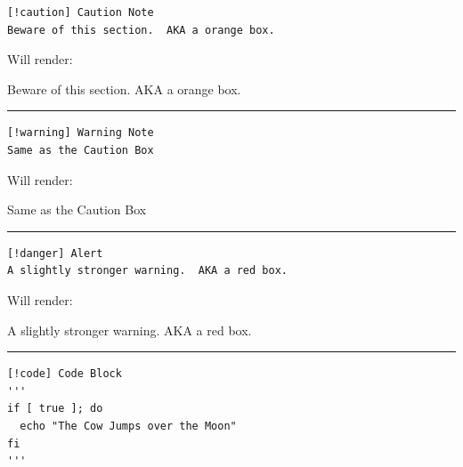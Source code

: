 \documentclass[
  12pt,
  openany]{book}
\begin{document}
\begin{codebox}
\begin{verbatim}
[!caution] Caution Note
Beware of this section.  AKA a orange box.
\end{verbatim}

\end{codebox}

Will render:

\begin{cautionbox}
Beware of this section. AKA a orange box.
\end{cautionbox}

\begin{center}\rule{0.5\linewidth}{0.5pt}\end{center}

\begin{codebox}
\begin{verbatim}
[!warning] Warning Note
Same as the Caution Box
\end{verbatim}

\end{codebox}

Will render:

\begin{warningbox}
Same as the Caution Box
\end{warningbox}

\begin{center}\rule{0.5\linewidth}{0.5pt}\end{center}

\begin{codebox}
\begin{verbatim}
[!danger] Alert
A slightly stronger warning.  AKA a red box.
\end{verbatim}

\end{codebox}

Will render:

\begin{dangerbox}[Alert]
A slightly stronger warning. AKA a red box.
\end{dangerbox}

\begin{center}\rule{0.5\linewidth}{0.5pt}\end{center}

\begin{codebox}
\begin{verbatim}
[!code] Code Block
'''
if [ true ]; do
  echo "The Cow Jumps over the Moon"
fi
'''
\end{verbatim}

\end{codebox}
\end{document}
